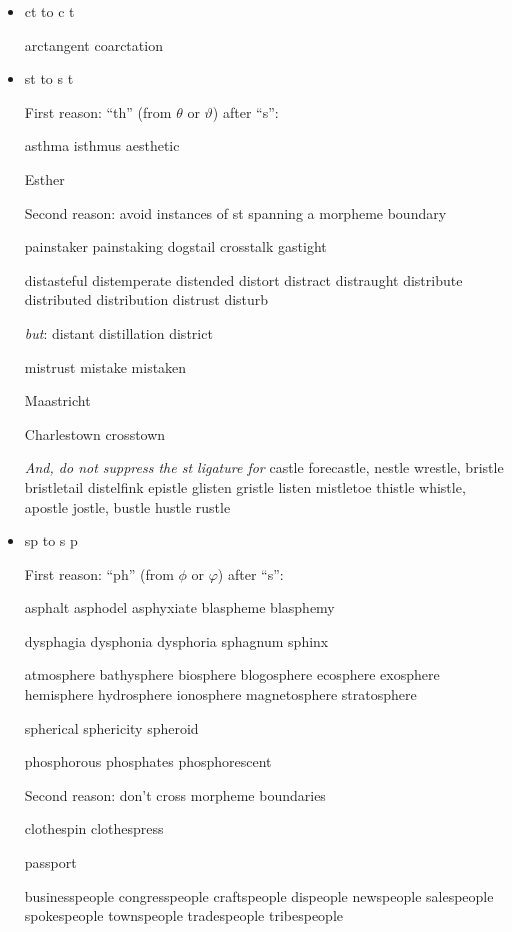 \begin{itemize}

\item ct to c\kern0pt t

arctangent coarctation 


\item st to s\kern0pt t

First reason: ``th'' (from $\theta$ or $\vartheta$) after ``s'':

asthma isthmus aesthetic

Esther


\medskip
Second reason: avoid instances of st spanning a morpheme boundary

painstaker painstaking dogstail crosstalk gastight

distasteful distemperate distended distort distract distraught distribute distributed distribution  distrust disturb

\emph{but}: distant distillation district

mistrust mistake mistaken

Maastricht

Charlestown crosstown




\emph{And, do not suppress the st ligature for} castle forecastle, nestle wrestle, bristle bristletail distelfink epistle glisten gristle listen mistletoe thistle whistle, apostle jostle, bustle hustle rustle 




\item sp to s\kern0pt p

First reason: ``ph'' (from $\phi$ or $\varphi$) after ``s'':

asphalt asphodel asphyxiate blaspheme blasphemy

dysphagia dysphonia dysphoria sphagnum sphinx

atmosphere bathysphere biosphere blogosphere ecosphere exosphere hemisphere hydrosphere ionosphere magnetosphere stratosphere

spherical sphericity spheroid 

phosphorous phosphates phosphorescent

\medskip
Second reason: don't cross morpheme boundaries

clothespin clothespress 

passport

businesspeople congresspeople craftspeople dispeople newspeople salespeople spokespeople townspeople tradespeople tribespeople


\end{itemize}
